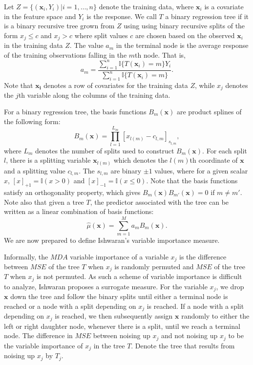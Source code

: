 \documentclass[12pt,twoside]{reedthesis}
\theoremstyle{definition}
\theoremstyle{definition}
\theoremstyle{definition}
\theoremstyle{remark}
\begin{document}
Let \(Z=\{(\mathbf{x}_i,Y_i)|i=1,\ldots,n\}\) denote the training data,
where \(\mathbf{x}_i\) is a covariate in the feature space and \(Y_i\)
is the response. We call \(T\) a binary regression tree if it is a
binary recursive tree grown from \(Z\) using using binary recursive
splits of the form \(x_j\leq c\) and \(x_j> c\) where split values \(c\)
are chosen based on the observed \(\mathbf{x}_i\) in the training data
\(Z\). The value \(a_m\) in the terminal node is the average response of
the training observations falling in the \(m\)th node. That is,
\[a_m=\frac{\sum_{i=1}^n \mathbb{I}\{T(\mathbf{x}_i)=m\} Y_i}{\sum_{i=1}^n \mathbb{I}\{T(\mathbf{x}_i)=m\}}.\]
Note that \(\mathbf{x_i}\) denotes a row of covariates for the training
data \(Z\), while \(x_j\) denotes the \(j\)th variable along the columns
of the training data. \par

For a binary regression tree, the basis functions \(B_m(\mathbf{x})\)
are product splines of the following form:
\[B_m(\mathbf{x})=\prod_{l = 1}^{L_m} [x_{l(m)}-c_{l, m}]_{s_{l,m}},\]
where \(L_m\) denotes the number of splits used to construct
\(B_m(\mathbf{x})\). For each split \(l\), there is a splitting variable
\(\mathbf{x}_{l(m)}\) which denotes the \(l(m)\)th coordinate of
\(\mathbf{x}\) and a splitting value \(c_{l,m}\). The \(s_{l,m}\) are
binary \(\pm 1\) values, where for a given scalar \(x\),
\([x]_{+1}=\mathbb{I}(x>0)\) and \([x]_{-1}=\mathbb{I}(x\leq 0).\) Note
that the basis functions satisfy an orthogonality property, which gives
\(B_m(\mathbf{x})B_{m'}(\mathbf{x})=0\) if \(m\neq m'\). Note also that
given a tree \(T\), the predictor associated with the tree can be
written as a linear combination of basis functions:
\[\hat{\mu}(\mathbf{x})=\sum_{m=1}^M a_m B_m(\mathbf{x}).\] We are now
prepared to define Ishwaran's variable importance measure. \par

Informally, the \(MDA\) variable importance of a variable \(x_j\) is the
difference between \(MSE\) of the tree \(T\) when \(x_j\) is randomly
permuted and \(MSE\) of the tree \(T\) when \(x_j\) is not permuted. As
such a scheme of variable importance is difficult to analyze, Ishwaran
proposes a surrogate measure. For the variable \(x_j\), we drop
\(\mathbf{x}\) down the tree and follow the binary splits until either a
terminal node is reached or a node with a split depending on \(x_j\) is
reached. If a node with a split depending on \(x_j\) is reached, we then
subsequently assign \(\mathbf{x}\) randomly to either the left or right
daughter node, whenever there is a split, until we reach a terminal
node. The difference in \(MSE\) between noising up \(x_j\) and not
noising up \(x_j\) to be the variable importance of \(x_j\) in the tree
\(T\). Denote the tree that results from noising up \(x_j\) by \(T_j\).
\par
\end{document}

